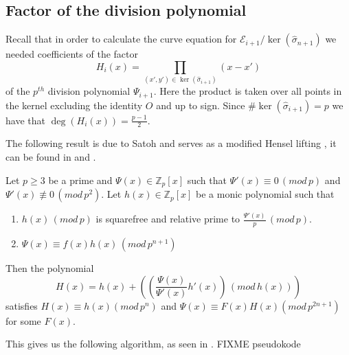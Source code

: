 \subsection{Factor of the division polynomial} \label{satohdiv}
Recall that in order to calculate the curve equation for $\mathscr{E}_{i+1}/\ker(\widehat{\sigma}_{n+1})$
we needed coefficients of the factor
$$H_i(x) = \prod_{(x',y')\in \ker(\widehat{\sigma}_{i+1})} (x-x')$$
of the $p^{th}$ division polynomial $\Psi_{i+1}$. Here the product is taken over all points in
the kernel excluding the identity $O$ and up to sign. Since $\#\ker(\widehat{\sigma}_{i+1}) = p$ we have
that $\deg(H_i(x)) = \frac{p-1}{2}$.

The following result is due to Satoh and serves as a modified Hensel lifting \cite{Robert}, it can be found
in \cite{Satoh} and \cite{Handbook}.
\begin{prop}
 Let $p\geq 3$ be a prime and $\Psi(x) \in \mathbb{Z}_p[x]$ such that $\Psi'(x) \equiv 0\, (mod\, p)$ and
$\Psi'(x) \not\equiv 0\, (mod\, p^2)$. Let $h(x) \in \mathbb{Z}_p[x]$ be a monic polynomial such that
\begin{enumerate}
  \item $h(x) \,(mod\,p)$ is squarefree and relative prime to $\frac{\Psi'(x)}{p}\,(mod\,p)$.
  \item $\Psi(x) \equiv f(x)h(x)\,(mod\,p^{n+1})$
\end{enumerate}
Then the polynomial
$$H(x) = h(x) + \left(\left(\frac{\Psi(x)}{\Psi'(x)} h'(x)\right)\,(mod\, h(x))\right)$$
satisfies $H(x) \equiv h(x) (mod\, p^n)$ and $\Psi(x) \equiv F(x)H(x) (mod \, p^{2n+1})$ for some $F(x)$.
\end{prop}
This gives us the following algorithm, as seen in \cite{Handbook}.
FIXME pseudokode